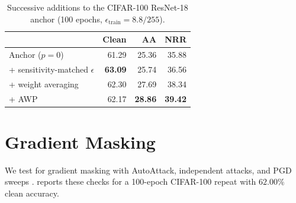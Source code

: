 \begin{table}[!htbp]
  \centering \small \setlength{\tabcolsep}{5pt}
  \caption{Successive additions to the CIFAR-100 ResNet-18 anchor (100 epochs,
  $\epsilon_{\mathrm{train}}=8.8/255$).}
  \label{tab:ladder}
  \begin{tabular}{lrrr}
    \toprule
    & Clean & AA & NRR \\
    \midrule
    Anchor ($p=0$)                         & 61.29 & 25.36 & 35.88 \\
    \quad + sensitivity-matched $\epsilon$ & \textbf{63.09} & 25.74 & 36.56 \\
    \quad + weight averaging               & 62.30 & 27.69 & 38.34 \\
    \quad + AWP                            & 62.17 & \textbf{28.86} & \textbf{39.42} \\
    \bottomrule
  \end{tabular}
\end{table}

\section{Gradient Masking}
\label{app:gradmask}

We test for gradient masking with AutoAttack, independent attacks, and PGD sweeps
\citep{athalye2018obfuscated}.  reports these checks for a 100-epoch CIFAR-100
repeat with $62.00\%$ clean accuracy.

